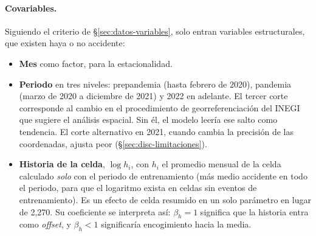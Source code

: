 \paragraph{Covariables.} Siguiendo el criterio de §\ref{sec:datos-variables},
solo entran variables estructurales, que existen haya o no accidente:
\begin{itemize}
	\item \textbf{Mes} como factor, para la estacionalidad.
	\item \textbf{Periodo} en tres niveles: prepandemia (hasta febrero de 2020),
	      pandemia (marzo de 2020 a diciembre de 2021) y 2022 en adelante. El
	      tercer corte corresponde al cambio en el procedimiento de
	      georreferenciación del INEGI que sugiere el análisis espacial. Sin él, el
	      modelo leería ese salto como tendencia. El corte alternativo en 2021,
	      cuando cambia la precisión de las coordenadas, ajusta peor
	      (§\ref{sec:disc-limitaciones}).
	\item \textbf{Historia de la celda}, $\log h_i$, con $h_i$ el promedio
	      mensual de la celda calculado \emph{solo} con el periodo de
	      entrenamiento (más medio accidente en todo el periodo, para que el
	      logaritmo exista en celdas sin eventos de entrenamiento). Es un efecto de
	      celda resumido en un solo parámetro en lugar de 2,270. Su coeficiente se
	      interpreta así: $\beta_h = 1$ significa que la historia entra como
	      \emph{offset}, y $\beta_h < 1$ significaría encogimiento hacia la media.
\end{itemize}

